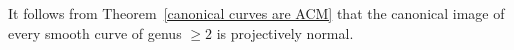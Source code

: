 It follows from Theorem~\ref{canonical curves are ACM} that the canonical image of every smooth curve of genus $\geq 2$ is projectively normal. 

%
%
% 
%
%
% 
% 
%   
%
%
